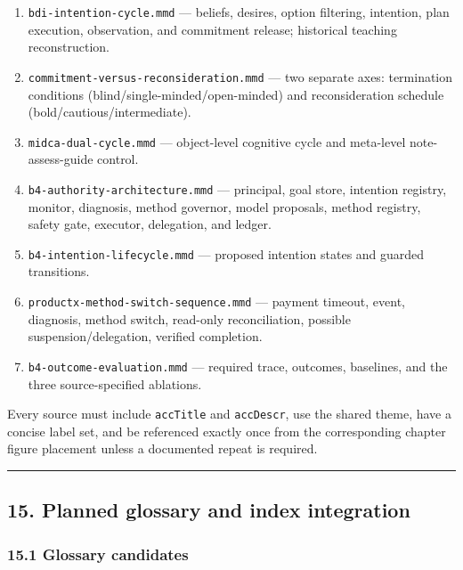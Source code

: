 \begin{enumerate}
\def\labelenumi{\arabic{enumi}.}
\tightlist
\item
  \texttt{bdi-intention-cycle.mmd} --- beliefs, desires, option filtering, intention, plan execution, observation, and commitment release; historical teaching reconstruction.
\item
  \texttt{commitment-versus-reconsideration.mmd} --- two separate axes: termination conditions (blind/single-minded/open-minded) and reconsideration schedule (bold/cautious/intermediate).
\item
  \texttt{midca-dual-cycle.mmd} --- object-level cognitive cycle and meta-level note-assess-guide control.
\item
  \texttt{b4-authority-architecture.mmd} --- principal, goal store, intention registry, monitor, diagnosis, method governor, model proposals, method registry, safety gate, executor, delegation, and ledger.
\item
  \texttt{b4-intention-lifecycle.mmd} --- proposed intention states and guarded transitions.
\item
  \texttt{productx-method-switch-sequence.mmd} --- payment timeout, event, diagnosis, method switch, read-only reconciliation, possible suspension/delegation, verified completion.
\item
  \texttt{b4-outcome-evaluation.mmd} --- required trace, outcomes, baselines, and the three source-specified ablations.
\end{enumerate}

Every source must include \texttt{accTitle} and \texttt{accDescr}, use the shared theme, have a concise label set, and be referenced exactly once from the corresponding chapter figure placement unless a documented repeat is required.

\begin{center}\rule{0.5\linewidth}{0.5pt}\end{center}

\subsection{15. Planned glossary and index integration}\label{planned-glossary-and-index-integration}

\subsubsection{15.1 Glossary candidates}\label{glossary-candidates}

